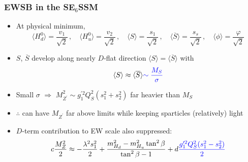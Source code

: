 \documentclass[10pt,aspectratio=169]{beamer}
\begin{document}
\begin{frame}
  \frametitle{EWSB in the SE$_6$SSM}
  \begin{itemize}\itemsep1em
  \item At physical minimum,
    \begin{equation*}
      \langle H_d^0 \rangle = \frac{v_1}{\sqrt{2}} \, , \quad
      \langle H_u^0 \rangle = \frac{v_2}{\sqrt{2}} \, , \quad
      \langle S \rangle = \frac{s_1}{\sqrt{2}} \, , \quad
      \langle \overline{S} \rangle = \frac{s_s}{\sqrt{2}} \, , \quad
      \langle \phi \rangle = \frac{\varphi}{\sqrt{2}}
    \end{equation*}
  \item $S$, $\overline{S}$ develop along nearly $D$-flat direction
    $\langle S \rangle = \langle \overline{S} \rangle$ with
    \begin{equation*}
      \langle S \rangle \approx \langle \overline{S} \rangle
              {\color{blue} \sim \frac{M_S}{\sigma}}
    \end{equation*}
  \item Small $\sigma$ $\Rightarrow$ $M_{Z^\prime}^2 \sim g_1^{\prime 2} Q_S^2
    (s_1^2 + s_2^2)$ far heavier than $M_S$
  \item $\therefore$ can have $M_{Z^\prime}$ far above limits while keeping
    sparticles (relatively) light
  \item $D$-term contribution to EW scale also suppressed:
    \begin{equation*}
    c \frac{M_Z^2}{2}
    \approx -\frac{\lambda^2 s_1^2}{2} + \frac{m_{H_d}^2 -
      m_{H_u}^2 \tan^2\beta} {\tan^2\beta - 1} + d
      {\color{blue} \frac{g_1'^2 Q_S^2 (s_1^2 - s_2^2)}{2}}
    \end{equation*}
  \end{itemize}
\end{frame}
\end{document}
